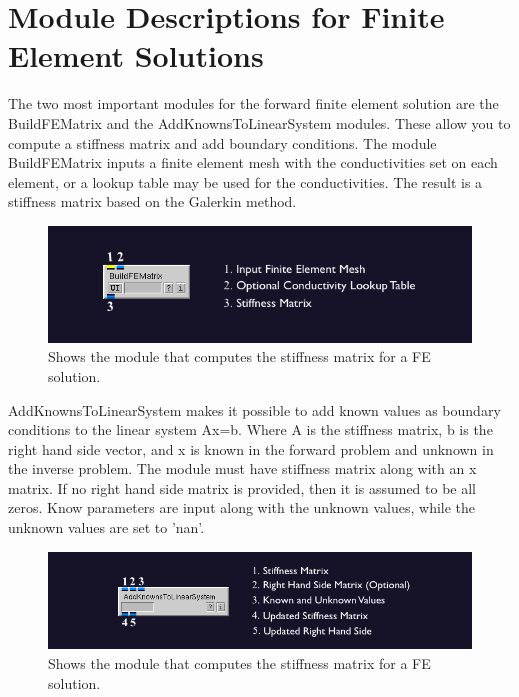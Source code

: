 \section{Module Descriptions for Finite Element Solutions}
The two most important modules for the forward finite element solution are the BuildFEMatrix 
and the AddKnownsToLinearSystem modules.  These allow you to compute a stiffness matrix and add boundary conditions.  The module BuildFEMatrix inputs a finite element mesh with the conductivities set on each element, or a lookup table may be used for the conductivities.  The result is a stiffness matrix based on the Galerkin method.

\begin{figure}[H]
\begin{center}
\includegraphics[width=\textwidth]{ECGToolkitGuide_figures/FEMmod.png}
\caption{Shows the module that computes the stiffness matrix for a FE solution.}
\label{FEM}
\end{center}
\end{figure}

AddKnownsToLinearSystem makes it possible to add known values as boundary conditions
to the linear system Ax=b.  Where A is the stiffness matrix, b is the right hand side vector, and 
x is known in the forward problem and unknown in the inverse problem.  The module must have stiffness matrix along with an x matrix.  If no right hand side matrix is provided, then it is assumed to be all zeros.  Know parameters are input along with the unknown values, while the unknown
values are set to 'nan'.

\begin{figure}[H]
\begin{center}
\includegraphics[width=\textwidth]{ECGToolkitGuide_figures/AddKnowns.png}
\caption{Shows the module that computes the stiffness matrix for a FE solution.}
\label{AddKnowns}
\end{center}
\end{figure}


